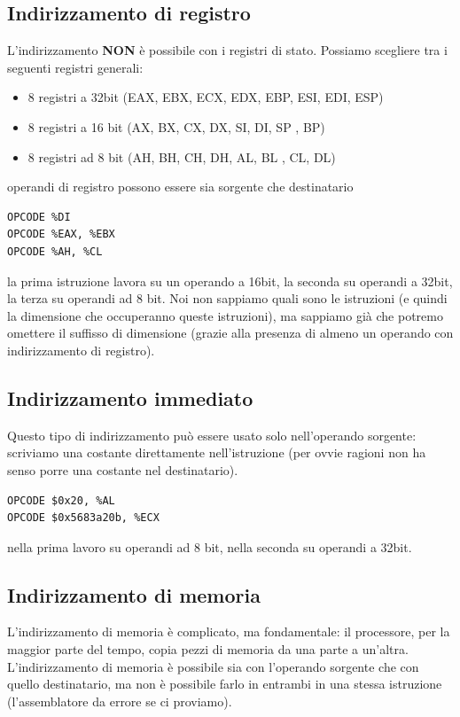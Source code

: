 \documentclass[11pt]{report}
\begin{document}
\subsection{Indirizzamento di registro}
L'indirizzamento \textbf{NON} è possibile con i registri di stato. Possiamo scegliere tra i seguenti registri generali:
\begin{itemize}
\item 8 registri a 32bit (EAX, EBX, ECX, EDX, EBP, ESI, EDI, ESP)
\item 8 registri a 16 bit (AX, BX, CX, DX, SI, DI, SP , BP)
\item 8 registri ad 8 bit (AH, BH, CH, DH, AL, BL , CL, DL)
\end{itemize}
operandi di registro possono essere sia sorgente che destinatario
\begin{verbatim}
OPCODE %DI
OPCODE %EAX, %EBX
OPCODE %AH, %CL
\end{verbatim}
la prima istruzione lavora su un operando a 16bit, la seconda su operandi a 32bit, la terza su operandi ad 8 bit. Noi non sappiamo quali sono le istruzioni (e quindi la dimensione che occuperanno queste istruzioni), ma sappiamo già che potremo omettere il suffisso di dimensione (grazie alla presenza di almeno un operando con indirizzamento di registro).

\subsection{Indirizzamento immediato}
Questo tipo di indirizzamento può essere usato solo nell'operando sorgente: scriviamo una costante direttamente nell'istruzione (per ovvie ragioni non ha senso porre una costante nel destinatario).
\begin{verbatim}
OPCODE $0x20, %AL
OPCODE $0x5683a20b, %ECX
\end{verbatim}
nella prima lavoro su operandi ad 8 bit, nella seconda su operandi a 32bit.

\subsection{Indirizzamento di memoria}
L'indirizzamento di memoria è complicato, ma fondamentale: il processore, per la maggior parte del tempo, copia pezzi di memoria da una parte a un'altra. L'indirizzamento di memoria è possibile sia con l'operando sorgente che con quello destinatario, ma non è possibile farlo in entrambi in una stessa istruzione (l'assemblatore da errore se ci proviamo). 
\end{document}
